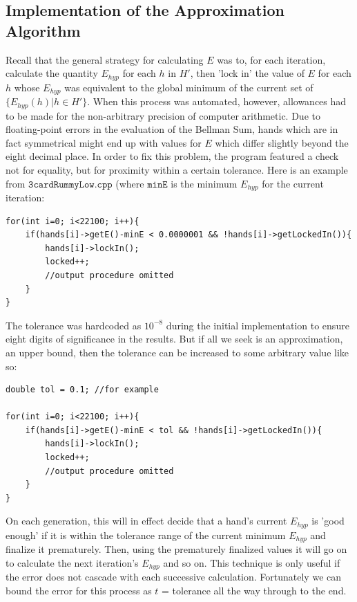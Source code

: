 \documentclass[letter,12pt]{article}
\begin{document}
\subsection{Implementation of the Approximation Algorithm}

Recall that the general strategy for calculating $E$ was to, for each iteration, calculate the quantity $E_{hyp}$ for each $h$ in $H'$, then 'lock in' the value of $E$ for each $h$ whose $E_{hyp}$ was equivalent to the global minimum of the current set of $\{E_{hyp}(h) | h \in H' \}$. When this process was automated, however, allowances had to be made for the non-arbitrary precision of computer arithmetic. Due to floating-point errors in the evaluation of the Bellman Sum, hands which are in fact symmetrical might end up with values for $E$ which differ slightly beyond the eight decimal place. In order to fix this problem, the program featured a check not for equality, but for proximity within a certain tolerance.  Here is an example from $\texttt{3cardRummyLow.cpp}$ (where $\texttt{minE}$ is the minimum $E_{hyp}$ for the current iteration:

\begin{verbatim}
for(int i=0; i<22100; i++){
    if(hands[i]->getE()-minE < 0.0000001 && !hands[i]->getLockedIn()){
        hands[i]->lockIn();
        locked++;
        //output procedure omitted
    }
}
\end{verbatim}
The tolerance was hardcoded as $10^{-8}$ during the initial implementation to ensure eight digits of significance in the results. But if all we seek is an approximation, an upper bound, then the tolerance can be increased to some arbitrary value like so:

\begin{verbatim}
double tol = 0.1; //for example

for(int i=0; i<22100; i++){
    if(hands[i]->getE()-minE < tol && !hands[i]->getLockedIn()){
        hands[i]->lockIn();
        locked++;
        //output procedure omitted
    }
}
\end{verbatim}

On each generation, this will in effect decide that a hand's current $E_{hyp}$ is 'good enough' if it is within the tolerance range of the current minimum $E_{hyp}$ and finalize it prematurely. Then, using the prematurely finalized values it will go on to calculate the next iteration's $E_{hyp}$ and so on. This technique is only useful if the error does not cascade with each successive calculation. Fortunately we can bound the error for this process as $t$ = tolerance all the way through to the end.
\end{document}
